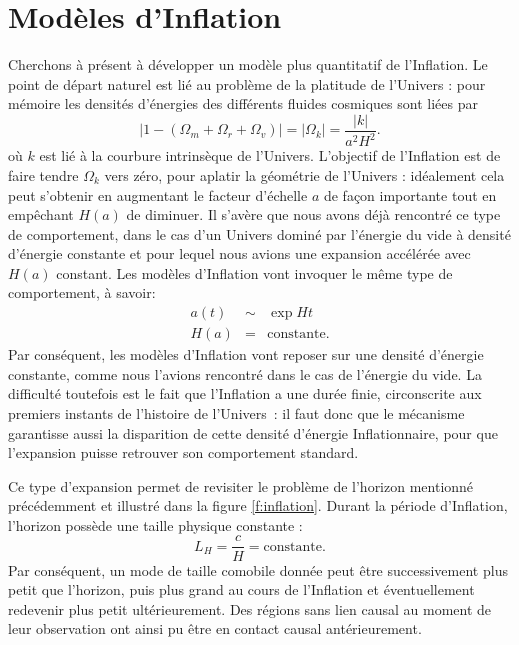 \section{Modèles d'Inflation}
Cherchons à présent à développer un modèle plus quantitatif de l'Inflation. Le point de départ naturel est lié au problème de la platitude de l'Univers : pour mémoire les densités d'énergies des différents fluides cosmiques sont liées par 
\begin{equation}
|1-(\Omega_m+\Omega_r+\Omega_v)|=|\Omega_k|=\frac{|k|}{a^2H^2}.
\end{equation}
où $k$ est lié à la courbure intrinsèque de l'Univers. L'objectif de l'Inflation est de faire tendre $\Omega_k$ vers zéro, pour aplatir la géométrie de l'Univers : idéalement cela peut s'obtenir en augmentant le facteur d'échelle $a$ de façon importante tout en empêchant $H(a)$ de diminuer. Il s'avère que nous avons déjà rencontré ce type de comportement, dans le cas d'un Univers dominé par l'énergie du vide à densité d'énergie constante et pour lequel nous avions une expansion accélérée avec $H(a)$ constant. Les modèles d'Inflation vont invoquer le même type de comportement, à savoir:
\begin{eqnarray}
a(t)&\sim&\exp{Ht}\\
H(a)&=&\mathrm{constante}.
\end{eqnarray} 
Par conséquent, les modèles d'Inflation vont reposer sur une densité d'énergie constante, comme nous l'avions rencontré dans le cas de l'énergie du vide. La difficulté toutefois est le fait que l'Inflation a une durée finie, circonscrite aux premiers instants de l'histoire de l'Univers~: il faut donc que le mécanisme garantisse aussi la disparition de cette densité d'énergie Inflationnaire, pour que l'expansion puisse retrouver son comportement standard.

Ce type d'expansion permet de revisiter le problème de l'horizon mentionné précédemment et illustré dans la figure \ref{f:inflation}. Durant la période d'Inflation, l'horizon possède une taille physique constante :
\begin{equation}
L_H=\frac{c}{H}=\mathrm{constante}.
\end{equation}
Par conséquent, un mode de taille comobile donnée peut être successivement plus petit que l'horizon, puis plus grand au cours de l'Inflation et éventuellement redevenir plus petit ultérieurement. Des régions sans lien causal au moment de leur observation ont ainsi pu être en contact causal antérieurement.


